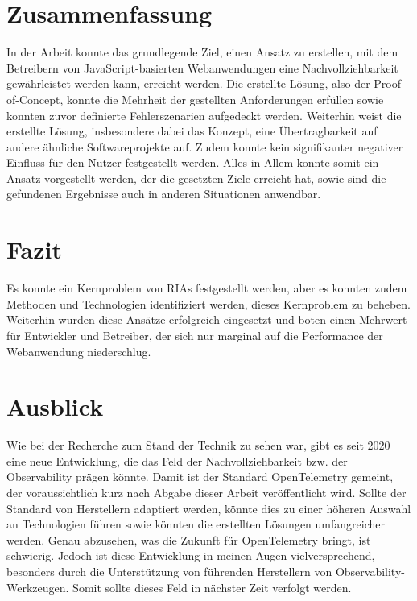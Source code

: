 
\section{Zusammenfassung}

In der Arbeit konnte das grundlegende Ziel, einen Ansatz zu erstellen, mit dem Betreibern von JavaScript-basierten Webanwendungen eine Nachvollziehbarkeit gewährleistet werden kann, erreicht werden. Die erstellte Lösung, also der Proof-of-Concept, konnte die Mehrheit der gestellten Anforderungen erfüllen sowie konnten zuvor definierte Fehlerszenarien aufgedeckt werden. Weiterhin weist die erstellte Lösung, insbesondere dabei das Konzept, eine Übertragbarkeit auf andere ähnliche Softwareprojekte auf. Zudem konnte kein signifikanter negativer Einfluss für den Nutzer festgestellt werden. Alles in Allem konnte somit ein Ansatz vorgestellt werden, der die gesetzten Ziele erreicht hat, sowie sind die gefundenen Ergebnisse auch in anderen Situationen anwendbar.

\section{Fazit}

Es konnte ein Kernproblem von RIAs festgestellt werden, aber es konnten zudem Methoden und Technologien identifiziert werden, dieses Kernproblem zu beheben. Weiterhin wurden diese Ansätze erfolgreich eingesetzt und boten einen Mehrwert für Entwickler und Betreiber, der sich nur marginal auf die Performance der Webanwendung niederschlug.

\section{Ausblick}

Wie bei der Recherche zum Stand der Technik zu sehen war, gibt es seit 2020 eine neue Entwicklung, die das Feld der Nachvollziehbarkeit bzw. der Observability prägen könnte. Damit ist der Standard OpenTelemetry gemeint, der voraussichtlich kurz nach Abgabe dieser Arbeit veröffentlicht wird. Sollte der Standard von Herstellern adaptiert werden, könnte dies zu einer höheren Auswahl an Technologien führen sowie könnten die erstellten Lösungen umfangreicher werden. Genau abzusehen, was die Zukunft für OpenTelemetry bringt, ist schwierig. Jedoch ist diese Entwicklung in meinen Augen vielversprechend, besonders durch die Unterstützung von führenden Herstellern von Observability-Werkzeugen. Somit sollte dieses Feld in nächster Zeit verfolgt werden.